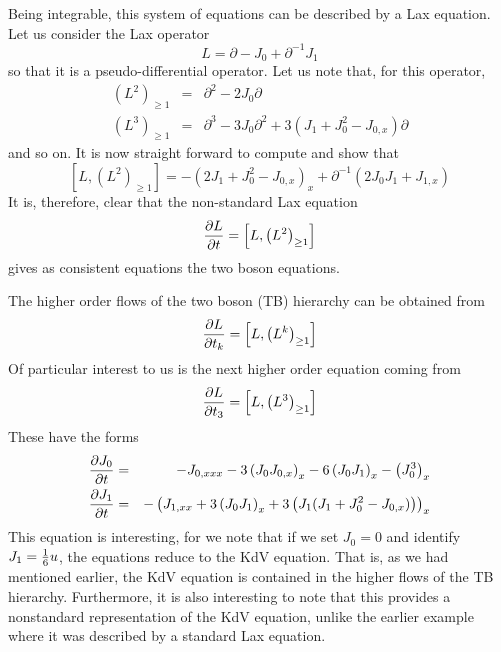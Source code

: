 \documentclass[a4paper,11pt]{article}
\begin{document}
Being integrable, this system of equations can be described by a Lax
equation. Let us consider the Lax operator
\begin{equation}
L = \partial - J_{0} + \partial^{-1} J_{1}
\end{equation}
so that it is a pseudo-differential operator. Let us note that, for
this operator,
\begin{eqnarray}
\left(L^{2}\right)_{\geq 1} & = & \partial^{2} - 2 J_{0}
\partial\nonumber\\
\left(L^{3}\right)_{\geq 1} & = & \partial^{3} - 3J_{0} \partial^{2} +
3 (J_{1} + J_{0}^{2} - J_{0,x}) \partial
\end{eqnarray}
and so on. It is now straight forward to compute and show that
\begin{equation}
\left[ L , \left(L^{2}\right)_{\geq 1} \right] =  - \left(2J_{1} +
J_{0}^{2} - J_{0,x}\right)_{x} + \partial^{-1} \left(2J_{0}J_{1} +
J_{1,x}\right)
\end{equation}
It is, therefore, clear that the non-standard Lax equation
\begin{equation}
{\partial L\over \partial t} = \left[ L , \left(L^{2}\right)_{\geq
1}\right]
\end{equation}
gives as consistent equations the two boson equations.

The higher order flows of the two boson (TB) hierarchy can be obtained
from
\begin{equation}
{\partial L\over \partial t_{k}} = \left[ L , \left(L^{k}\right)_{\geq
1}\right]
\end{equation}
Of particular interest to us is the next higher order equation coming
from
\begin{equation}
{\partial L\over \partial t_{3}} = \left[ L , \left(L^{3}\right)_{\geq
1}\right]
\end{equation}
These have the forms
\begin{eqnarray}
{\partial J_{0}\over \partial t} & = & - J_{0,xxx} -
3\left(J_{0}J_{0,x}\right)_{x} - 6 \left(J_{0}J_{1}\right)_{x} -
\left(J_{0}^{3}\right)_{x}\nonumber\\
{\partial J_{1}\over \partial t} & = & - \left(J_{1,xx} + 3
\left(J_{0}J_{1}\right)_{x} + 3 \left(J_{1}(J_{1} + J_{0}^{2} -
J_{0,x})\right)\right)_{x}
\end{eqnarray}
This equation is interesting, for we note that if we set $J_{0}=0$ and
identify $J_{1}={1\over 6} u$, the equations reduce to the KdV
equation. That is, as we had mentioned earlier, the KdV equation is
contained in the higher flows of the TB hierarchy. Furthermore, it is
also interesting to note that this provides a nonstandard
representation of the KdV equation, unlike the earlier example where
it was described by a standard Lax equation.
\end{document}
